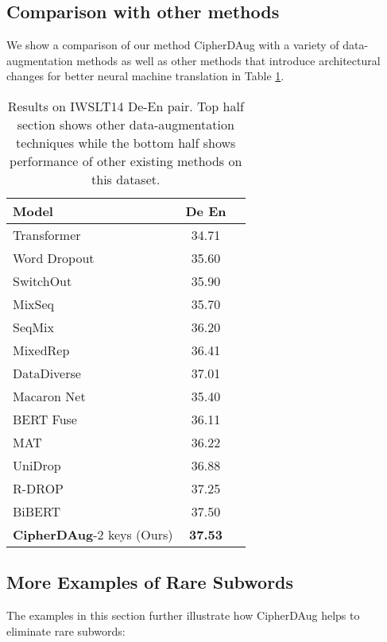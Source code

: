 \documentclass[11pt]{article}
\begin{document}
\subsection{Comparison with other methods}




We show a comparison of our method CipherDAug with a variety of data-augmentation  methods as well as other methods that introduce architectural changes for better neural machine translation in Table \ref{tab:othermethods}.

\begin{table}[ht]

\footnotesize
\centering
\begin{tabular}{lcl}
\toprule
 \textbf{Model} & \textbf{De  En} \\ \midrule
 Transformer & 34.71 \\
 \hline
 Word Dropout & 35.60 \\
 SwitchOut & 35.90 \\
 MixSeq \cite{wu-etal-2021-mixseq} & 35.70 \\
 SeqMix \cite{guo2020sequence} & 36.20 \\
 MixedRep \cite{pmlr-v119-wu20e} & 36.41 \\
 DataDiverse \cite{nguyen2020data} & 37.01 \\
 \midrule
 Macaron Net \cite{lu*2020understanding} & 35.40 \\
 BERT Fuse \cite{Zhu2020Incorporating} & 36.11 \\
 MAT \cite{fan2020multibranch} & 36.22 \\ 
 UniDrop \cite{wu-etal-2021-unidrop} & 36.88 \\
 R-DROP \cite{liang2021rdrop} & 37.25 \\
 BiBERT \cite{xu2021bert} & 37.50 \\
 \midrule
 \textbf{CipherDAug}-2 keys (Ours) & \textbf{37.53} \\ 
\bottomrule
\end{tabular}
\caption{Results on IWSLT14 De-En pair. Top half section shows other data-augmentation techniques while the bottom half shows performance of other existing methods on this dataset.}
\label{tab:othermethods}
\end{table}

\subsection{More Examples of Rare Subwords}
The examples in this section further illustrate how CipherDAug helps to eliminate rare subwords:
\end{document}
